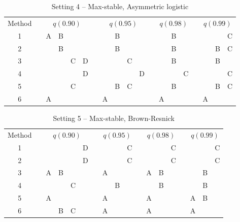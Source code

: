 \begin{table}[htbp]
  \centering
  \caption{Setting 4 -- Max-stable, Asymmetric logistic}
  \label{sttbl:mssim}
  \begin{tabular}{c c cccc c cccc c ccc c ccc}
  \toprule
    Method & \phantom{a} & \multicolumn{4}{c}{$q(0.90)$} & \phantom{a} & \multicolumn{4}{c}{$q(0.95)$} & \phantom{a} & \multicolumn{3}{c}{$q(0.98)$} & \phantom{a} & \multicolumn{3}{c}{$q(0.99)$} \\
    \cmidrule{1-1} \cmidrule{3-6} \cmidrule{8-11} \cmidrule{13-15} \cmidrule{17-19}
    1 && A & B &   &   &&   & B &   &   &&   & B &   &&   &   & C \\
    2 &&   & B &   &   &&   & B &   &   &&   & B &   &&   & B & C \\
    3 &&   &   & C & D &&   &   & C &   &&   & B &   &&   & B &   \\
    4 &&   &   &   & D &&   &   &   & D &&   &   & C &&   &   & C \\
    5 &&   &   & C &   &&   & B & C &   &&   & B &   &&   & B & C \\
    6 && A &   &   &   && A &   &   &   && A &   &   && A &   &   \\
    \bottomrule
  \end{tabular}
\end{table}

\begin{table}[htbp]
  \centering
  \caption{Setting 5 -- Max-stable, Brown-Resnick}
  \label{sttbl:transsim}
  \begin{tabular}{c c cccc c ccc c ccc c ccc}
  \toprule
    Method & \phantom{a} & \multicolumn{4}{c}{$q(0.90)$} & \phantom{a} & \multicolumn{3}{c}{$q(0.95)$} & \phantom{a} & \multicolumn{3}{c}{$q(0.98)$} & \phantom{a} & \multicolumn{3}{c}{$q(0.99)$} \\
    \cmidrule{1-1} \cmidrule{3-6} \cmidrule{8-10} \cmidrule{12-14} \cmidrule{16-18}
    1 &&   &   &   & D &&   &   & C &&   &   & C &&   &   & C \\
    2 &&   &   &   & D &&   &   & C &&   &   & C &&   &   & C \\
    3 && A & B &   &   && A &   &   && A & B &   &&   & B &   \\
    4 &&   &   & C &   &&   & B &   &&   & B &   &&   & B &   \\
    5 && A &   &   &   && A &   &   && A &   &   && A & B &   \\
    6 &&   & B & C &   && A &   &   && A &   &   && A &   &   \\
    \bottomrule
  \end{tabular}
\end{table}
\vspace{\fill}